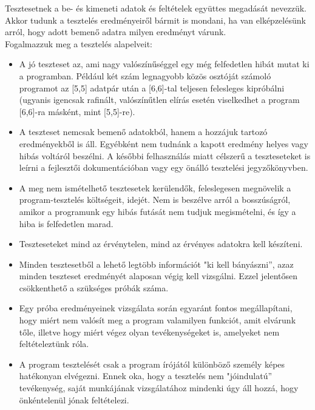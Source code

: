 \documentclass[margin=0px]{article}
\begin{document}
Tesztesetnek a be- és kimeneti adatok és feltételek együttes megadását nevezzük. Akkor tudunk a tesztelés eredményeiről bármit is mondani, ha van elképzelésünk arról, hogy adott bemenő adatra milyen eredményt várunk.\\

\noindent Fogalmazzuk meg a tesztelés alapelveit:
\begin{itemize}
    \item 	A jó teszteset az, ami nagy valószínűséggel egy még felfedetlen hibát mutat ki a programban. Például két szám legnagyobb közös osztóját számoló programot az [5,5] adatpár után a [6,6]-tal teljesen felesleges kipróbálni (ugyanis igencsak rafinált, valószínűtlen elírás esetén viselkedhet a program [6,6]-ra másként, mint [5,5]-re).

    \item 	A teszteset nemcsak bemenő adatokból, hanem a hozzájuk tartozó eredményekből is áll. Egyébként nem tudnánk a kapott eredmény helyes vagy hibás voltáról beszélni. A későbbi felhasználás miatt célszerű a teszteseteket is leírni a fejlesztői dokumentációban vagy egy önálló tesztelési jegyzőkönyvben.

    \item	A meg nem ismételhető tesztesetek kerülendők, feleslegesen megnövelik a program-tesztelés költségeit, idejét. Nem is beszélve arról a bosszúságról, amikor a programunk egy hibás futását nem tudjuk megismételni, és így a hiba is felfedetlen marad.

    \item	Teszteseteket mind az érvénytelen, mind az érvényes adatokra kell készíteni.

    \item 	Minden tesztesetből a lehető legtöbb információt "ki kell bányászni”, azaz minden teszteset eredményét alaposan végig kell vizsgálni. Ezzel jelentősen csökkenthető a szükséges próbák száma.

    \item	Egy próba eredményeinek vizsgálata során egyaránt fontos megállapítani, hogy miért nem valósít meg a program valamilyen funkciót, amit elvárunk tőle, illetve hogy miért végez olyan tevékenységeket is, amelyeket nem feltételeztünk róla.

    \item	A program tesztelését csak a program írójától különböző személy képes hatékonyan elvégezni. Ennek oka, hogy a tesztelés nem "jóindulatú” tevékenység, saját munkájának vizsgálatához mindenki úgy áll hozzá, hogy önkéntelenül jónak feltételezi.
\end{itemize}
\end{document}
